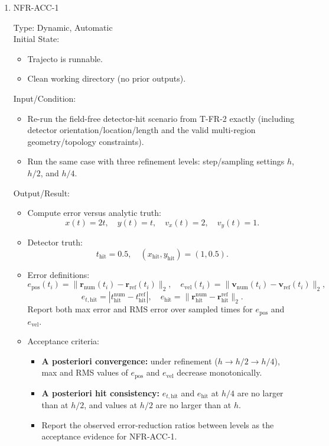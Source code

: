 \documentclass[12pt, titlepage]{article}
\begin{document}
\begin{enumerate}

\item{NFR-ACC-1\\}

Type: Dynamic, Automatic\\

Initial State:
\begin{itemize}
  \item Trajecto is runnable.
  \item Clean working directory (no prior outputs).
\end{itemize}

Input/Condition:
\begin{itemize}
  \item Re-run the field-free detector-hit scenario from T-FR-2 exactly
  (including detector orientation/location/length and the valid multi-region
  geometry/topology constraints).
  \item Run the same case with three refinement levels:
  step/sampling settings $h$, $h/2$, and $h/4$.
\end{itemize}

Output/Result:
\begin{itemize}
  \item Compute error versus analytic truth:
  \[
    x(t)=2t,\quad y(t)=t,\quad v_x(t)=2,\quad v_y(t)=1.
  \]
  \item Detector truth:
  \[
    t_{\mathrm{hit}} = 0.5,\quad (x_{\mathrm{hit}},y_{\mathrm{hit}})=(1,0.5).
  \]
  \item Error definitions:
  \[
    e_{\mathrm{pos}}(t_i)=\|\mathbf{r}_{\mathrm{num}}(t_i)-\mathbf{r}_{\mathrm{ref}}(t_i)\|_2,\quad
    e_{\mathrm{vel}}(t_i)=\|\mathbf{v}_{\mathrm{num}}(t_i)-\mathbf{v}_{\mathrm{ref}}(t_i)\|_2,
  \]
  \[
    e_{t,\mathrm{hit}}=\left|t_{\mathrm{hit}}^{\mathrm{num}}-t_{\mathrm{hit}}^{\mathrm{ref}}\right|,\quad
    e_{\mathrm{hit}}=\|\mathbf{r}_{\mathrm{hit}}^{\mathrm{num}}-\mathbf{r}_{\mathrm{hit}}^{\mathrm{ref}}\|_2.
  \]
  Report both max error and RMS error over sampled times for
  $e_{\mathrm{pos}}$ and $e_{\mathrm{vel}}$.
  \item Acceptance criteria:
  \begin{itemize}
    \item \textbf{A posteriori convergence:} under refinement
    ($h\rightarrow h/2\rightarrow h/4$), max and RMS values of
    $e_{\mathrm{pos}}$ and $e_{\mathrm{vel}}$ decrease monotonically.
    \item \textbf{A posteriori hit consistency:}
    $e_{t,\mathrm{hit}}$ and $e_{\mathrm{hit}}$ at $h/4$ are no larger than at
    $h/2$, and values at $h/2$ are no larger than at $h$.
    \item Report the observed error-reduction ratios between levels as the
    acceptance evidence for NFR-ACC-1.
  \end{itemize}
\end{itemize}


\end{enumerate}
\end{document}
